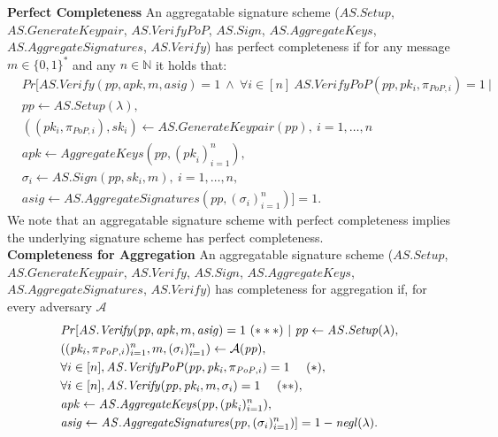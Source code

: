 \noindent \textbf{Perfect Completeness} An aggregatable signature scheme
($\mathit{AS.Setup}$, \\ $\mathit{AS.GenerateKeypair}$, $\mathit{AS.VerifyPoP}$, $\mathit{AS.Sign}$, $\mathit{AS.AggregateKeys}$,\\ 
$\mathit{AS.AggregateSignatures}$, $\mathit{AS.Verify}$) has perfect completeness if for any message $m \in \{0,1\}^*$ and any 
$n\in\mathbb{N}$ it holds that:
\begin{align*}
& \mathit{Pr} [\mathit{AS.Verify}(\mathit{pp}, \mathit{apk}, m, \mathit{asig})=1 \ \wedge \ \forall  i \in [n]\ \mathit{AS.VerifyPoP}(\mathit{pp}, \mathit{pk_i},\mathit{\pi_{\mathit{PoP},i}})=1\ |\\
& \mathit{pp} \leftarrow \mathit{AS.Setup(\lambda)}, \\
& ((pk_{i},\pi_{\mathit{PoP}, i}), sk_{i} ) \leftarrow \mathit{AS.GenerateKeypair}(\mathit{pp}),\ i=1,\ldots,n\\
&\mathit{apk} \leftarrow \mathit{AggregateKeys}(\mathit{pp}, (\mathit{pk}_{i})_{i=1}^{n}), \\
& \sigma_i \leftarrow \mathit{AS.Sign}(\mathit{pp}, \mathit{sk_i}, m),\ i=1,\ldots,n, \\
& \mathit{asig} \leftarrow \mathit{AS.AggregateSignatures(\mathit{pp}, (\sigma_{i})_{i=1}^{n})}] = 1.
\end{align*}
\noindent We note that an aggregatable signature scheme with perfect completeness implies the underlying signature scheme
has perfect completeness. \\

\noindent \textbf{Completeness for Aggregation} An aggregatable signature scheme 
($\mathit{AS.Setup}$, $\mathit{AS.GenerateKeypair}$, $\mathit{AS.Verify}$, $\mathit{AS.Sign}$,
$\mathit{AS.AggregateKeys}$, $\mathit{AS.AggregateSignatures}$, $\mathit{AS.Verify}$)
has completeness for aggregation if, for every adversary $\mathcal{A}$
\begin{align*}
&\mathit{Pr}[\mathit{AS.Verify}(\mathit{pp}, \mathit{apk}, m, \mathit{asig}) = 1 \ (\ast\ast\ast) \ | \ \mathit{pp} \leftarrow \mathit{AS.Setup}(\lambda), \\
& ((\mathit{pk_i}, \pi_{\mathit{PoP},i})_{i=1}^n, m, (\sigma_i)_{i=1}^{n}) \leftarrow \mathcal{A}(\mathit{\mathit{pp})}, \\
& \forall i \in [n], \mathit{AS.VerifyPoP}(\mathit{pp}, \mathit{pk_i}, \pi_{\mathit{PoP},i}) = 1 \ \ \ \ (\ast), \\
& \forall i \in [n], \mathit{AS.Verify}(\mathit{pp}, \mathit{pk_i}, m, \sigma_i) = 1 \ \ \ \ (\ast\ast),\\
& \mathit{apk} \leftarrow \mathit{AS.AggregateKeys}(\mathit{pp},  (\mathit{pk}_{i})_{i=1}^{n}), \\
&  \mathit{asig} \leftarrow \mathit{AS.AggregateSignatures}(\mathit{pp}, (\sigma_i)_{i=1}^n)] = 1- \mathit{negl}(\lambda).
\end{align*}


